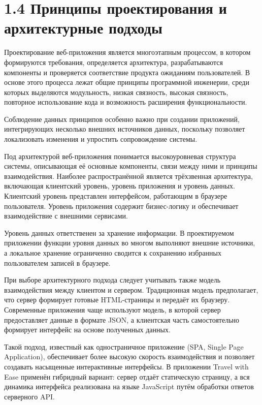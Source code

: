 \documentclass[14pt,a4paper,oneside]{extreport}
\begin{document}

\section*{1.4 Принципы проектирования и архитектурные подходы}

Проектирование веб-приложения является многоэтапным процессом, в котором формируются требования, определяется архитектура, разрабатываются компоненты и проверяется соответствие продукта ожиданиям пользователей. В основе этого процесса лежат общие принципы программной инженерии, среди которых выделяются модульность, низкая связность, высокая связность, повторное использование кода и возможность расширения функциональности.

Соблюдение данных принципов особенно важно при создании приложений, интегрирующих несколько внешних источников данных, поскольку позволяет локализовать изменения и упростить сопровождение системы.

Под архитектурой веб-приложения понимается высокоуровневая структура системы, описывающая её основные компоненты, связи между ними и принципы взаимодействия. Наиболее распространённой является трёхзвенная архитектура, включающая клиентский уровень, уровень приложения и уровень данных. Клиентский уровень представлен интерфейсом, работающим в браузере пользователя. Уровень приложения содержит бизнес-логику и обеспечивает взаимодействие с внешними сервисами.

Уровень данных ответственен за хранение информации. В проектируемом приложении функции уровня данных во многом выполняют внешние источники, а локальное хранение ограниченно сводится к сохранению избранных пользователем записей в браузере.

При выборе архитектурного подхода следует учитывать также модель взаимодействия между клиентом и сервером. Традиционная модель предполагает, что сервер формирует готовые HTML-страницы и передаёт их браузеру. Современные приложения чаще используют модель, в которой сервер предоставляет данные в формате JSON, а клиентская часть самостоятельно формирует интерфейс на основе полученных данных.

Такой подход, известный как одностраничное приложение (SPA, Single Page Application), обеспечивает более высокую скорость взаимодействия и позволяет создавать насыщенные интерактивные интерфейсы. В приложении Travel with Ease применён гибридный вариант: сервер отдаёт статическую страницу, а вся динамика интерфейса реализована на языке JavaScript путём обработки ответов серверного API.
\end{document}
